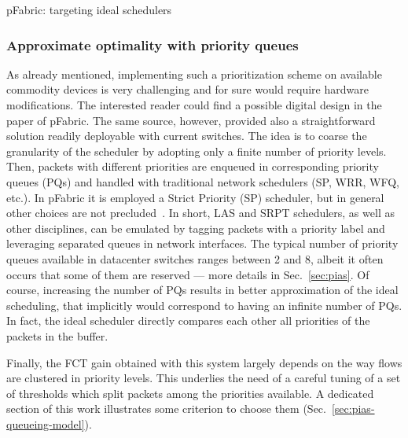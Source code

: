 \begin{subsection}{pFabric: targeting ideal schedulers}
 \subsubsection{Approximate optimality with priority queues}
As already mentioned, implementing such a prioritization scheme on available commodity devices is very challenging and for sure would require hardware modifications. The interested reader could find a possible digital design in the paper of pFabric. The same source, however, provided also a straightforward solution readily deployable with current switches. The idea is to coarse the granularity of the scheduler by adopting only a finite number of priority levels. Then, packets with different priorities are enqueued in corresponding priority queues (PQs) and handled with traditional network schedulers (SP, WRR, WFQ, etc.). In pFabric it is employed a Strict Priority (SP) scheduler, but in general other choices are not precluded~\cite{mqecn}. In short, LAS and SRPT schedulers, as well as other disciplines, can be emulated by tagging packets with a priority label and leveraging separated queues in network interfaces. The typical number of priority queues available in datacenter switches ranges between 2 and 8, albeit it often occurs that some of them are reserved --- more details in Sec.~\ref{sec:pias}. Of course, increasing the number of PQs results in better approximation of the ideal scheduling, that implicitly would correspond to having an infinite number of PQs. In fact, the ideal scheduler directly compares each other all priorities of the packets in the buffer.

Finally, the FCT gain obtained with this system largely depends on the way flows are clustered in priority levels. This underlies the need of a careful tuning of a set of thresholds which split packets among the priorities available. A dedicated section of this work illustrates some criterion to choose them (Sec.~\ref{sec:pias-queueing-model}). 

\end{subsection}

